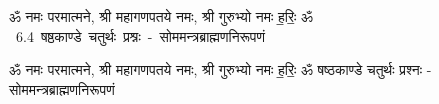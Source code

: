 \documentclass[17pt]{extarticle}
\begin{document}
\begin{titlepage}
    \begin{center}
 
\begin{sanskrit}
    { \Large
    ॐ नमः परमात्मने, श्री महागणपतये नमः, श्री गुरुभ्यो नमः
ह॒रिः॒ ॐ 
    }
    \\
    \vspace{2.5cm}
    \mbox{ \Huge
    6.4       षष्ठकाण्डे चतुर्थः प्रश्नः - सोममन्त्रब्राह्मणनिरूपणं   }
\end{sanskrit}
\end{center}

\end{titlepage}
\tableofcontents

ॐ नमः परमात्मने, श्री महागणपतये नमः, श्री गुरुभ्यो नमः
ह॒रिः॒ ॐ        षष्ठकाण्डे चतुर्थः प्रश्नः - सोममन्त्रब्राह्मणनिरूपणं \newline

\end{document}
